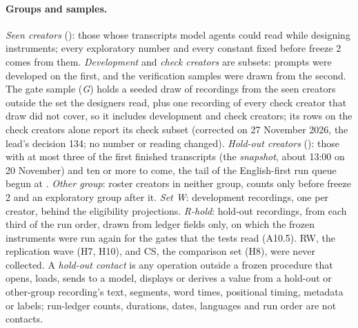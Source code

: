 \paragraph{Groups and samples.} \emph{Seen creators} (\NSeen): those whose transcripts model agents could read while
designing instruments; every exploratory number and every constant fixed before freeze 2 comes from them.
\emph{Development} and \emph{check creators} are subsets: prompts were developed on the first, and the verification
samples were drawn from the second. The gate sample (\emph{G}) holds a seeded draw of recordings from the seen creators
outside the set the designers read, plus one recording of every check creator that draw did not cover, so it includes
development and check creators; its rows on the check creators alone report its check subset (corrected on 27 November
2026, the lead's decision 134; no number or reading changed). \emph{Hold-out creators} (\NHoldout): those with at
most three of the first \SnapLines{} finished transcripts (the \emph{snapshot}, about 13:00 on 20 November) and ten or
more to come, the tail of the English-first run queue begun at \EnglishFirstStamp. \emph{Other group}:
\NOtherCreators{} roster creators in neither group, counts only before freeze 2 and an exploratory group after it.
\emph{Set W}: \PilotWRecordings{} development recordings, one per creator, behind the eligibility projections.
\emph{R-hold}: \RholdRecordings{} hold-out recordings, \RholdPerThird{} from each third of the run order, drawn from
ledger fields only, on which the frozen instruments were run again for the gates that the tests read (A10.5). RW, the
replication wave (H7, H10), and CS, the comparison set (H8), were never collected. A \emph{hold-out contact} is any
operation outside a frozen procedure that opens, loads, sends to a model, displays or derives a value from a hold-out
or other-group recording's text, segments, word times, positional timing, metadata or labels; run-ledger counts,
durations, dates, languages and run order are not contacts.

